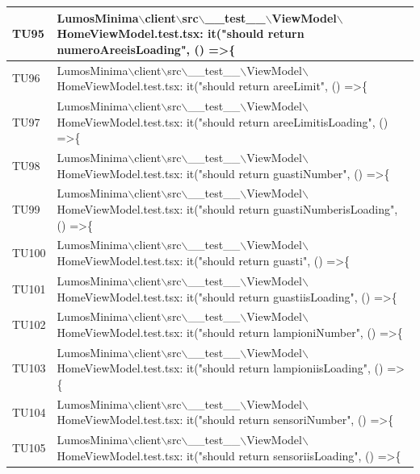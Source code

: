 \documentclass[12pt]{article}
\begin{document}
\begin{xltabular}{\linewidth}{|>{\hsize}X|X|}
	TU95 & LumosMinima$\backslash$client$\backslash$src$\backslash$\_\_test\_\_$\backslash$ViewModel$\backslash$HomeViewModel.test.tsx: it("should return numeroAreeisLoading", () =\textgreater \{ \\ \hline
	TU96 & LumosMinima$\backslash$client$\backslash$src$\backslash$\_\_test\_\_$\backslash$ViewModel$\backslash$HomeViewModel.test.tsx: it("should return areeLimit", () =\textgreater \{ \\ \hline
	TU97 & LumosMinima$\backslash$client$\backslash$src$\backslash$\_\_test\_\_$\backslash$ViewModel$\backslash$HomeViewModel.test.tsx: it("should return areeLimitisLoading", () =\textgreater \{ \\ \hline
	TU98 & LumosMinima$\backslash$client$\backslash$src$\backslash$\_\_test\_\_$\backslash$ViewModel$\backslash$HomeViewModel.test.tsx: it("should return guastiNumber", () =\textgreater \{ \\ \hline
	TU99 & LumosMinima$\backslash$client$\backslash$src$\backslash$\_\_test\_\_$\backslash$ViewModel$\backslash$HomeViewModel.test.tsx: it("should return guastiNumberisLoading", () =\textgreater \{ \\ \hline
	TU100 & LumosMinima$\backslash$client$\backslash$src$\backslash$\_\_test\_\_$\backslash$ViewModel$\backslash$HomeViewModel.test.tsx: it("should return guasti", () =\textgreater \{ \\ \hline
	TU101 & LumosMinima$\backslash$client$\backslash$src$\backslash$\_\_test\_\_$\backslash$ViewModel$\backslash$HomeViewModel.test.tsx: it("should return guastiisLoading", () =\textgreater \{ \\ \hline
	TU102 & LumosMinima$\backslash$client$\backslash$src$\backslash$\_\_test\_\_$\backslash$ViewModel$\backslash$HomeViewModel.test.tsx: it("should return lampioniNumber", () =\textgreater \{ \\ \hline
	TU103 & LumosMinima$\backslash$client$\backslash$src$\backslash$\_\_test\_\_$\backslash$ViewModel$\backslash$HomeViewModel.test.tsx: it("should return lampioniisLoading", () =\textgreater \{ \\ \hline
	TU104 & LumosMinima$\backslash$client$\backslash$src$\backslash$\_\_test\_\_$\backslash$ViewModel$\backslash$HomeViewModel.test.tsx: it("should return sensoriNumber", () =\textgreater \{ \\ \hline
	TU105 & LumosMinima$\backslash$client$\backslash$src$\backslash$\_\_test\_\_$\backslash$ViewModel$\backslash$HomeViewModel.test.tsx: it("should return sensoriisLoading", () =\textgreater \{ \\ \hline

\end{xltabular}
\end{document}
